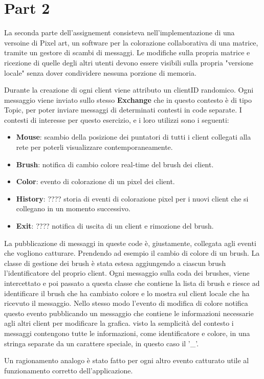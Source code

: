 \chapter{Part 2}
\label{ch:into} %

La seconda parte dell'assignement consisteva nell'implementazione di una versoine di Pixel art, un software per la colorazione 
collaborativa di una matrice, tramite un gestore di scambi di messaggi. Le modifiche sulla propria matrice e ricezione di quelle degli altri utenti 
devono essere visibili sulla propria "versione locale" senza dover condividere nessuna porzione di memoria.

Durante la creazione di ogni client viene attributo un clientID randomico. Ogni messaggio viene inviato sullo stesso \textbf{Exchange} che in questo contesto
è di tipo Topic, per poter inviare messaggi di determinati contesti in code separate. I contesti di interesse per questo esercizio, e i loro utilizzi sono i seguenti: 
\begin{itemize}
    \item \textbf{Mouse}: scambio della posizione dei puntatori di tutti i client collegati alla rete per poterli visualizzare contemporaneamente.
    \item \textbf{Brush}: notifica di cambio colore real-time del brush dei client.
    \item \textbf{Color}: evento di colorazione di un pixel dei client.
    \item \textbf{History}: ???? storia di eventi di colorazione pixel per i nuovi client che si collegano in un momento successivo. %
    \item \textbf{Exit}: ???? notifica di uscita di un client e rimozione del brush.%
\end{itemize}

La pubblicazione di messaggi in queste code è, giustamente, collegata agli eventi che vogliono catturare.
Prendendo ad esempio il cambio di colore di un brush. La classe di gestione dei brush è stata estesa aggiungendo a ciascun brush l'identificatore del proprio client.
Ogni messaggio sulla coda dei brushes, viene intercettato e poi passato a questa classe che contiene la lista di brush e riesce ad identificare il brush che ha cambiato colore
e lo mostra sul client locale che ha ricevuto il messaggio. Nello stesso modo l'evento di modifica di colore notifica questo evento pubblicando un messaggio che contiene le informazioni
necessarie agli altri client per modificare la grafica. visto la semplicità del contesto i messaggi contengono tutte le informazioni, come identificatore e colore, in una stringa 
separate da un carattere speciale, in questo caso il '_'. 

Un ragionamento analogo è stato fatto per ogni altro evento catturato utile al funzionamento corretto dell'applicazione. 